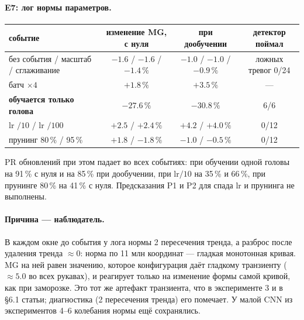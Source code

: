 \documentclass[10pt,a4paper]{article}
\newcommand{\good}[1]{\textcolor[HTML]{117733}{#1}}
\newcommand{\bad}[1]{\textcolor[HTML]{BB5566}{#1}}
\begin{document}
\paragraph{E7: лог нормы параметров.}
\begin{center}\small
\begin{tabular}{lccc}\toprule
событие & изменение MG, с нуля & при дообучении & детектор поймал\\\midrule
без события / масштаб / сглаживание & $-1.6$ / $-1.6$ / $-1.4\,\%$ & $-1.0$ / $-1.0$ / $-0.9\,\%$ & ложных тревог 0/24\\
батч $\times4$ & $+1.8\,\%$ & $+3.5\,\%$ & ---\\
\textbf{обучается только голова} & $\mathbf{-27.6\,\%}$ & $\mathbf{-30.8\,\%}$ & \good{6/6}\\
lr $/10$ / lr $/100$ & $+2.5$ / $+2.4\,\%$ & $+4.2$ / $+4.0\,\%$ & \bad{0/12}\\
прунинг 80\,\% / 95\,\% & $+1.8$ / $-1.8\,\%$ & $-1.0$ / $-0.5\,\%$ & \bad{0/12}\\
\bottomrule\end{tabular}
\end{center}
PR обновлений при этом падает во всех событиях: при обучении одной головы на
91\,\% с нуля и на 85\,\% при дообучении, при lr$/10$ на 35\,\% и 66\,\%, при
прунинге 80\,\% на 41\,\% с нуля. Предсказания P1 и P2 для спада lr и прунинга
\bad{не выполнены}.

\paragraph{Причина --- наблюдатель.} В каждом окне до события у лога нормы 2
пересечения тренда, а разброс после удаления тренда $\approx 0$: норма по 11 млн
координат --- гладкая монотонная кривая. MG на ней равен значению, которое
конфигурация даёт гладкому транзиенту ($\approx 5.0$ во всех рукавах), и реагирует
только на изменение формы самой кривой, как при заморозке. Это тот же артефакт
транзиента, что в эксперименте 3 и в §6.1 статьи; диагностика (2 пересечения тренда)
его помечает. У малой CNN из экспериментов 4--6 колебания нормы ещё сохранялись.
\end{document}
